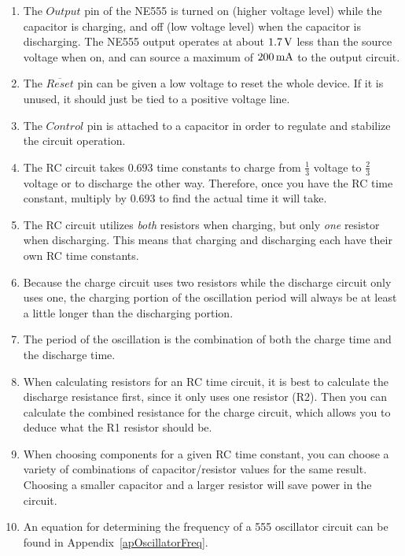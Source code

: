 \begin{enumerate}
\item The $Output$ pin of the NE555 is turned on (higher voltage level) while the capacitor is charging, and off (low voltage level) when the capacitor is discharging.  The NE555 output operates at about $1.7\,\si{\volt}$ less than the source voltage when on, and can source a maximum of $200\,\si{\milli\ampere}$ to the output circuit.
\item The $\overline{Reset}$ pin can be given a low voltage to reset the whole device.  If it is unused, it should just be tied to a positive voltage line.
\item The $Control$ pin is attached to a capacitor in order to regulate and stabilize the circuit operation.
\item The RC circuit takes $0.693$ time constants to charge from $\frac{1}{3}$ voltage to $\frac{2}{3}$ voltage or to discharge the other way.  Therefore, once you have the RC time constant, multiply by $0.693$ to find the actual time it will take.
\item The RC circuit utilizes \emph{both} resistors when charging, but only \emph{one} resistor when discharging.  This means that charging and discharging each have their own RC time constants.
\item Because the charge circuit uses two resistors while the discharge circuit only uses one, the charging portion of the oscillation period will always be at least a little longer than the discharging portion.
\item The period of the oscillation is the combination of both the charge time and the discharge time.
\item When calculating resistors for an RC time circuit, it is best to calculate the discharge resistance first, since it only uses one resistor (R2).  Then you can calculate the combined resistance for the charge circuit, which allows you to deduce what the R1 resistor should be.
\item When choosing components for a given RC time constant, you can choose a variety of combinations of capacitor/resistor values for the same result.  Choosing a smaller capacitor and a larger resistor will save power in the circuit.
\item An equation for determining the frequency of a 555 oscillator circuit can be found in Appendix~\ref{apOscillatorFreq}.
\end{enumerate}

\applysection


